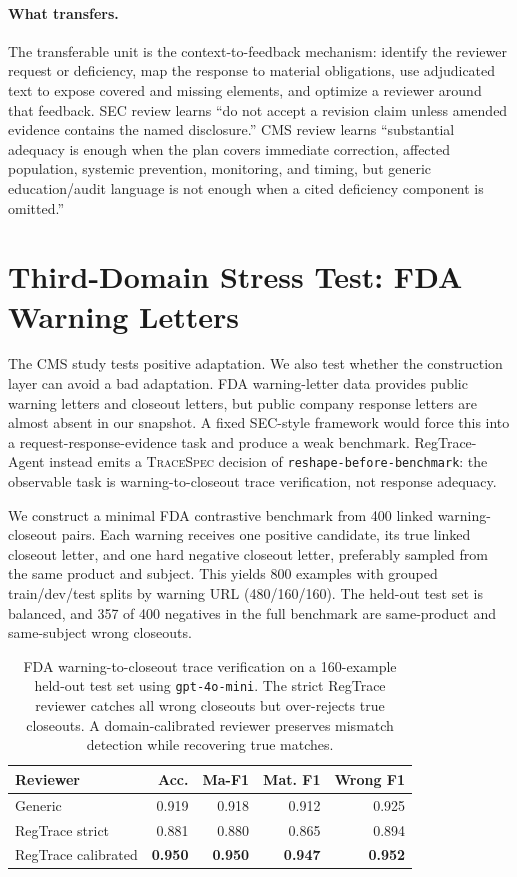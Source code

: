 \documentclass[11pt]{article}
\newcommand{\framework}{RegTrace-Agent}
\begin{document}
\paragraph{What transfers.}
The transferable unit is the context-to-feedback mechanism: identify the reviewer request or deficiency, map the response to material obligations, use adjudicated text to expose covered and missing elements, and optimize a reviewer around that feedback. SEC review learns ``do not accept a revision claim unless amended evidence contains the named disclosure.'' CMS review learns ``substantial adequacy is enough when the plan covers immediate correction, affected population, systemic prevention, monitoring, and timing, but generic education/audit language is not enough when a cited deficiency component is omitted.''

\section{Third-Domain Stress Test: FDA Warning Letters}
\label{sec:fda}

The CMS study tests positive adaptation. We also test whether the construction layer can avoid a bad adaptation. FDA warning-letter data provides public warning letters and closeout letters, but public company response letters are almost absent in our snapshot. A fixed SEC-style framework would force this into a request-response-evidence task and produce a weak benchmark. \framework{} instead emits a \textsc{TraceSpec} decision of \texttt{reshape-before-benchmark}: the observable task is warning-to-closeout trace verification, not response adequacy.

We construct a minimal FDA contrastive benchmark from 400 linked warning-closeout pairs. Each warning receives one positive candidate, its true linked closeout letter, and one hard negative closeout letter, preferably sampled from the same product and subject. This yields 800 examples with grouped train/dev/test splits by warning URL (480/160/160). The held-out test set is balanced, and 357 of 400 negatives in the full benchmark are same-product and same-subject wrong closeouts.

\begin{table}[t]
\centering
\scriptsize
\setlength{\tabcolsep}{2.5pt}
\begin{tabular}{lrrrr}
\toprule
\textbf{Reviewer} & \textbf{Acc.} & \textbf{Ma-F1} & \textbf{Mat. F1} & \textbf{Wrong F1} \\
\midrule
Generic & 0.919 & 0.918 & 0.912 & 0.925 \\
RegTrace strict & 0.881 & 0.880 & 0.865 & 0.894 \\
RegTrace calibrated & \textbf{0.950} & \textbf{0.950} & \textbf{0.947} & \textbf{0.952} \\
\bottomrule
\end{tabular}
\caption{FDA warning-to-closeout trace verification on a 160-example held-out test set using \texttt{gpt-4o-mini}. The strict RegTrace reviewer catches all wrong closeouts but over-rejects true closeouts. A domain-calibrated reviewer preserves mismatch detection while recovering true matches.}
\label{tab:fda}
\end{table}
\end{document}
